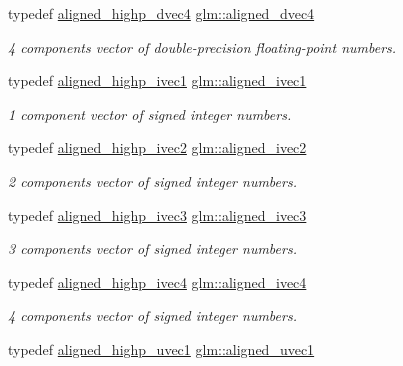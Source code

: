 \begin{DoxyCompactItemize}
typedef \mbox{\hyperlink{group__gtc__type__aligned_ga96f78b78823a228d1ca0cfa3be7e6a64}{aligned\+\_\+highp\+\_\+dvec4}} \mbox{\hyperlink{group__gtc__type__aligned_ga502d8d084a488118c9a5466d73ba1a46}{glm\+::aligned\+\_\+dvec4}}
\begin{DoxyCompactList}\small\item\em 4 components vector of double-\/precision floating-\/point numbers. \end{DoxyCompactList}\item 
typedef \mbox{\hyperlink{group__gtc__type__aligned_gaebfad60737b3a3ec596dc0341ed538c3}{aligned\+\_\+highp\+\_\+ivec1}} \mbox{\hyperlink{group__gtc__type__aligned_gafe9657c41fa58e912f99e92284d79fce}{glm\+::aligned\+\_\+ivec1}}
\begin{DoxyCompactList}\small\item\em 1 component vector of signed integer numbers. \end{DoxyCompactList}\item 
typedef \mbox{\hyperlink{group__gtc__type__aligned_ga9fe485a34b77916c1817ab4ba2ad3b20}{aligned\+\_\+highp\+\_\+ivec2}} \mbox{\hyperlink{group__gtc__type__aligned_ga2a709e1d21f3aae3f8d6de910f5fdff4}{glm\+::aligned\+\_\+ivec2}}
\begin{DoxyCompactList}\small\item\em 2 components vector of signed integer numbers. \end{DoxyCompactList}\item 
typedef \mbox{\hyperlink{group__gtc__type__aligned_gac7f1892e381baa066488c0b6d1bf16ad}{aligned\+\_\+highp\+\_\+ivec3}} \mbox{\hyperlink{group__gtc__type__aligned_gabbf85e492d39baef3a418c15c996ab65}{glm\+::aligned\+\_\+ivec3}}
\begin{DoxyCompactList}\small\item\em 3 components vector of signed integer numbers. \end{DoxyCompactList}\item 
typedef \mbox{\hyperlink{group__gtc__type__aligned_ga4dcc1c7c3d087b9f61635069fc97671b}{aligned\+\_\+highp\+\_\+ivec4}} \mbox{\hyperlink{group__gtc__type__aligned_gaa33169a30c7d22a8648f20b4534f635f}{glm\+::aligned\+\_\+ivec4}}
\begin{DoxyCompactList}\small\item\em 4 components vector of signed integer numbers. \end{DoxyCompactList}\item 
typedef \mbox{\hyperlink{group__gtc__type__aligned_ga14fec93434c0b98ff5318e49a1ae9185}{aligned\+\_\+highp\+\_\+uvec1}} \mbox{\hyperlink{group__gtc__type__aligned_gab0fbe9830a7129d9135b558b30eed930}{glm\+::aligned\+\_\+uvec1}}

\end{DoxyCompactItemize}
